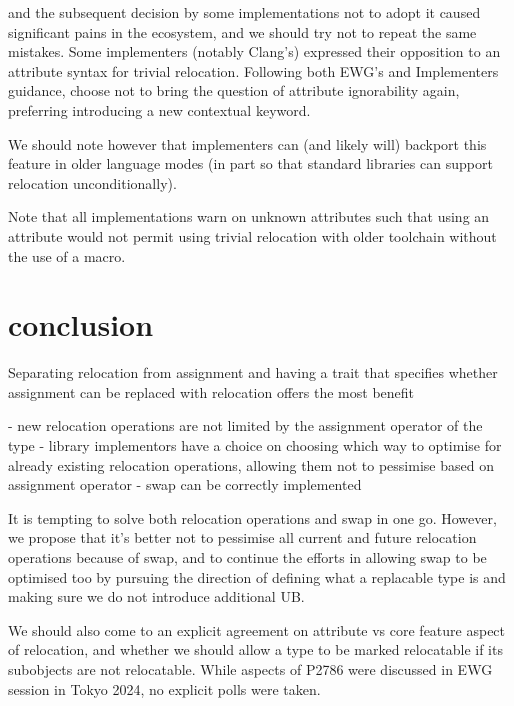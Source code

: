 \documentclass{wg21}
\begin{document}
 and the subsequent decision by some implementations not to adopt it caused significant pains
in the ecosystem, and we should try not to repeat the same mistakes.
Some implementers (notably Clang's) expressed their opposition to an attribute syntax for trivial relocation.
Following both EWG's and Implementers guidance,  choose not to bring the question of attribute ignorability again,
preferring introducing a new contextual keyword.

We should note however that implementers can (and likely will) backport this feature in older language modes
(in part so that standard libraries can support relocation unconditionally).

Note that all implementations warn on unknown attributes such that using an attribute would not permit using
trivial relocation with older toolchain without the use of a macro.


\section{conclusion}

Separating relocation from assignment and having a trait that specifies whether assignment can be replaced with relocation offers the most benefit

- new relocation operations are not limited by the assignment operator of the type
- library implementors have a choice on choosing which way to optimise for already existing relocation operations, allowing them not to pessimise based on assignment operator
- swap can be correctly implemented

It is tempting to solve both relocation operations and swap in one go. However, we propose that it's better not to pessimise all current and future relocation operations because of swap, and to continue the efforts in allowing swap to be optimised too by pursuing the direction of defining what a replacable type is and making sure we do not introduce additional UB.

We should also come to an explicit agreement on attribute vs core feature aspect of relocation, and whether we should allow a type to be marked relocatable if its subobjects are not relocatable. While aspects of P2786 were discussed in EWG session in Tokyo 2024, no explicit polls were taken.

\appendix





\renewcommand{\section}[2]{}%

\begin{thebibliography}{9}

\end{thebibliography}
\end{document}
